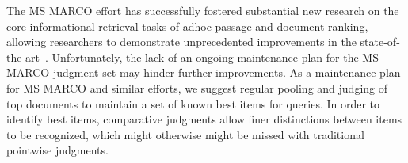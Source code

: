 \documentclass[fullpage]{article}
\begin{document}
The MS MARCO effort has successfully fostered substantial new research on the core informational retrieval tasks of adhoc passage and document ranking, allowing researchers to demonstrate unprecedented improvements in the state-of-the-art~\cite{marco21full,marco21short}. Unfortunately, the lack of an ongoing maintenance plan for the MS MARCO judgment set may hinder further improvements. As a maintenance plan for MS MARCO and similar efforts, we suggest regular pooling and judging of top documents to maintain a set of known best items for queries. In order to identify best items, comparative judgments allow finer distinctions between items to be recognized, which might otherwise might be missed with traditional pointwise judgments.


 
\end{document}
